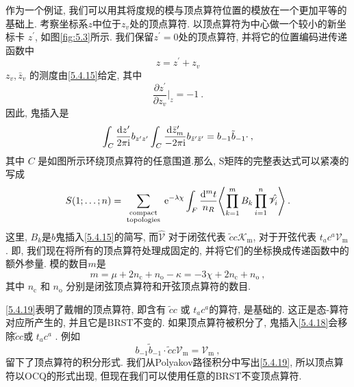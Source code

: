 作为一个例证, 我们可以用其将度规的模与顶点算符位置的模放在一个更加平等的基础上. 考察坐标系$z$中位于$z_{v}$处的顶点算符. 
以顶点算符为中心做一个较小的新坐标卡 $z^{\prime}$, 如图\ref{fig:5.3}所示. 我们保留$z^{\prime}=0$处的顶点算符, 并将它的位置编码进传递函数中
\begin{equation}
	z=z^{\prime}+z_{v} \label{5.4.16}
\end{equation}
 $z_{v}, \bar{z}_{v}$ 的测度由\eqref{5.4.15}给定, 其中
\begin{equation}
	\frac{\partial z^{\prime}}{\partial z_{v}}\biggr|_{z}=-1 \:. \label{5.4.17}
\end{equation}
因此, 鬼插入是
\begin{equation}
	\int_{C} \frac{\mathrm{d} z^{\prime}}{2 \pi \mathrm{i}} b_{z^{\prime} z^{\prime}} \int_{C} \frac{\mathrm{d} \bar{z}_{m}^{\prime}}{-2 \pi \mathrm{i}} b_{\bar{z}^{\prime} \bar{z}^{\prime}}=b_{-1} \tilde{b}_{-1} \cdot \:,  \label{5.4.18}
\end{equation}
其中 $C$ 是如图所示环绕顶点算符的任意围道.那么, S矩阵的完整表达式可以紧凑的写成
\begin{equation}
	S(1 ; \ldots ; n)=\sum_{\substack{\text{ compact } \\ \text{ topologies }}} \mathrm{e}^{-\lambda \chi} \int_{F} \frac{\mathrm{d}^{m} t}{n_{R}}\Biggl\langle\prod_{k=1}^{m} B_{k} \prod_{i=1}^{n} \hat{\mathscr{V}}_{i}\Biggr\rangle \:.\label{5.4.19}
\end{equation}
这里,  $B_{k}$是$b$鬼插入\eqref{5.4.15}的简写, 而$\hat{\mathscr{V}}$ 对于闭弦代表 $\tilde{c} c \mathscr{K}_{\mathrm{m}}$, 
对于开弦代表 $t_{a} c^{a} \mathscr{V}_{\mathrm{m}}$. 即, 我们现在将所有的顶点算符处理成固定的, 并将它们的坐标换成传递函数中的额外参量. 模的数目$m$是
\begin{equation}
	m=\mu+2 n_{\mathrm{c}}+n_{\mathrm{o}}-\kappa=-3 \chi+2 n_{\mathrm{c}}+n_{\mathrm{o}} \:, \label{5.4.20}
\end{equation}
其中 $n_{\mathrm{c}}$ 和 $n_{\mathrm{o}}$ 分别是闭弦顶点算符和开弦顶点算符的数目.

\eqref{5.4.19}表明了戴帽的顶点算符, 即含有 $\tilde{c} c$ 或 $t_{a} c^{a}$的算符, 是基础的. 这正是态-算符对应所产生的, 并且它是BRST不变的. 如果顶点算符被积分了, 鬼插入\eqref{5.4.18}会移除$\tilde{c} c$或 $t_{a} c^{a} $ . 例如
\begin{equation}
	b_{-1} \tilde{b}_{-1} \cdot \tilde{c} c \mathscr{V}_{\mathrm{m}}=\mathscr{V}_{\mathrm{m}} \:, \label{5.4.21}
\end{equation}
留下了顶点算符的积分形式. 我们从Polyakov路径积分中写出\eqref{5.4.19}, 所以顶点算符以OCQ的形式出现, 但现在我们可以使用任意的BRST不变顶点算符.

